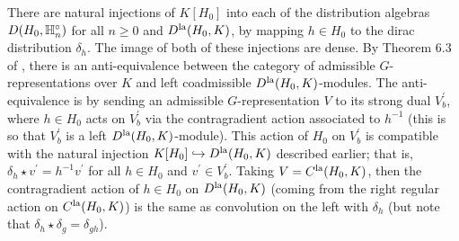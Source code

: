 \documentclass[10pt]{amsart}
\begin{document}
There are natural injections of $K[H_0]$ into each of the distribution algebras $D(H_{0},\mathbb{H}^{\circ}_{n})$ for all $n\geq 0$ and $D^{\textnormal{la}}(H_{0},K)$, by mapping $h\in H_{0}$ to the dirac distribution $\delta_{h}$. The image of both of these injections are dense. By Theorem 6.3 of \cite{ST_dist}, there is an anti-equivalence between the category of admissible $G$-representations over $K$ and left coadmissible $D^{\textnormal{la}}(H_{0},K)$-modules. The anti-equivalence is by sending an admissible $G$-representation $V$ to its strong dual $V^{\prime}_{b}$, where $h\in H_{0}$ acts on $V^{\prime}_{b}$ via the contragradient action associated to $h^{-1}$ (this is so that $V^{\prime}_{b}$ is a left $D^{\textnormal{la}}(H_{0},K)$-module). This action of $H_{0}$ on $V^{\prime}_{b}$ is compatible with the natural injection $K[H_{0}]\hookrightarrow D^{\textnormal{la}}(H_{0},K)$ described earlier; that is, $\delta_{h}\star v^\prime=h^{-1}v^{\prime}$ for all $h\in H_0$ and $v^{\prime} \in V^{\prime}_{b}$. Taking $V=C^{\textnormal{la}}(H_{0},K)$, then the contragradient action of $h\in H_{0}$ on $D^{\textnormal{la}}(H_{0},K)$ (coming from the right regular action on $C^{\textnormal{la}}(H_{0},K)$) is the same as convolution on the left with $\delta_{h}$ (but note that $\delta_{h}\star \delta_{g} = \delta_{gh}$). 
\end{document}
